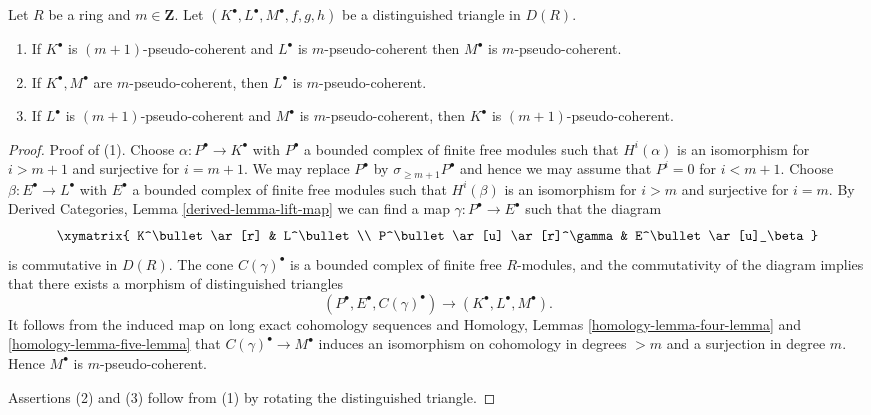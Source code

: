 \begin{lemma}
\label{lemma-cone-pseudo-coherent}
Let $R$ be a ring and $m \in \mathbf{Z}$.
Let $(K^\bullet, L^\bullet, M^\bullet, f, g, h)$ be a distinguished
triangle in $D(R)$.
\begin{enumerate}
\item If $K^\bullet$ is $(m + 1)$-pseudo-coherent and
$L^\bullet$ is $m$-pseudo-coherent then $M^\bullet$ is
$m$-pseudo-coherent.
\item If $K^\bullet, M^\bullet$ are $m$-pseudo-coherent, then
$L^\bullet$ is $m$-pseudo-coherent.
\item If $L^\bullet$ is $(m + 1)$-pseudo-coherent and $M^\bullet$
is $m$-pseudo-coherent, then $K^\bullet$ is $(m + 1)$-pseudo-coherent.
\end{enumerate}
\end{lemma}

\begin{proof}
Proof of (1). Choose $\alpha : P^\bullet \to K^\bullet$
with $P^\bullet$ a bounded complex of finite free modules
such that $H^i(\alpha)$ is an isomorphism for $i > m + 1$ and
surjective for $i = m + 1$. We may replace $P^\bullet$ by
$\sigma_{\geq m + 1}P^\bullet$ and hence we may assume that $P^i = 0$
for $i < m + 1$. Choose $\beta : E^\bullet \to L^\bullet$ with $E^\bullet$
a bounded complex of finite free modules such that
$H^i(\beta)$ is an isomorphism for $i > m$ and
surjective for $i = m$. By
Derived Categories,
Lemma \ref{derived-lemma-lift-map}
we can find a map $\gamma : P^\bullet \to E^\bullet$ such that the diagram
$$
\xymatrix{
K^\bullet \ar[r] & L^\bullet \\
P^\bullet \ar[u] \ar[r]^\gamma & E^\bullet \ar[u]_\beta
}
$$
is commutative in $D(R)$. The cone $C(\gamma)^\bullet$ is a bounded
complex of finite free $R$-modules, and the commutativity of the
diagram implies that there exists a morphism of distinguished triangles
$$
(P^\bullet, E^\bullet, C(\gamma)^\bullet)
\longrightarrow
(K^\bullet, L^\bullet, M^\bullet).
$$
It follows from the induced map on long exact cohomology sequences and
Homology, Lemmas \ref{homology-lemma-four-lemma} and
\ref{homology-lemma-five-lemma}
that $C(\gamma)^\bullet \to M^\bullet$ induces an isomorphism
on cohomology in degrees $> m$ and a surjection in degree $m$.
Hence $M^\bullet$ is $m$-pseudo-coherent.

\medskip\noindent
Assertions (2) and (3) follow from (1) by rotating the distinguished
triangle.
\end{proof}

